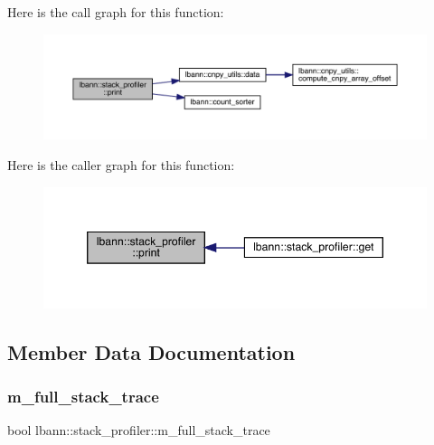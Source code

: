 Here is the call graph for this function\+:\nopagebreak
\begin{figure}[H]
\begin{center}
\leavevmode
\includegraphics[width=350pt]{classlbann_1_1stack__profiler_a27d55f6551cf445d3d0e9836858f6872_cgraph}
\end{center}
\end{figure}
Here is the caller graph for this function\+:\nopagebreak
\begin{figure}[H]
\begin{center}
\leavevmode
\includegraphics[width=346pt]{classlbann_1_1stack__profiler_a27d55f6551cf445d3d0e9836858f6872_icgraph}
\end{center}
\end{figure}


\subsection{Member Data Documentation}
\mbox{\label{classlbann_1_1stack__profiler_a7dd8bf137ea417ecf54537d64c6d296a}} 
\subsubsection{\texorpdfstring{m\+\_\+full\+\_\+stack\+\_\+trace}{m\_full\_stack\_trace}}
{\footnotesize\ttfamily bool lbann\+::stack\+\_\+profiler\+::m\+\_\+full\+\_\+stack\+\_\+trace\hspace{0.3cm}{\ttfamily [private]}}



